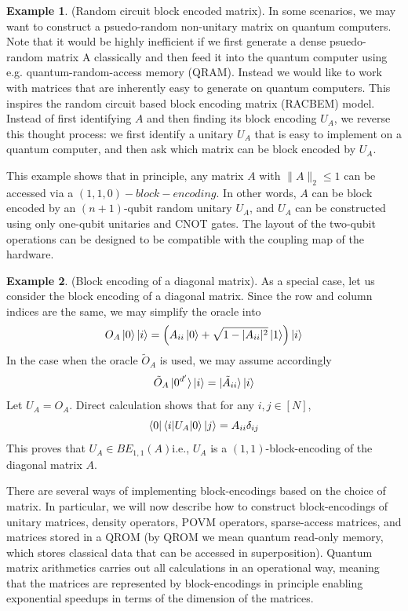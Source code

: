 \documentclass[12pt, oneside]{book}
\theoremstyle{definition}
\theoremstyle{definition}
\newtheorem{example}{Example}[section]
\theoremstyle{remark}
\begin{document}
\begin{example}
    (Random circuit block encoded matrix). In some scenarios, we may want to construct a psuedo-random non-unitary matrix on quantum computers. Note that it would be highly inefficient if we first generate a dense psuedo-random matrix A classically and then feed it into the quantum computer using e.g. quantum-random-access memory (QRAM). Instead we would like to work with matrices that are inherently easy to generate on quantum computers. This inspires the random circuit based block encoding matrix (RACBEM) model. Instead of first identifying $A$ and then finding its block encoding $U_A$, we reverse this thought process: we first identify a unitary $U_A$ that is easy to implement on a quantum computer, and then ask which matrix can be block encoded by $U_A$.
\end{example}
This example shows that in principle, any matrix $A$ with $\|A\|_2\leq 1$ can be accessed via a $(1,1,0)-block-encoding.$ In other words, $A$ can be block encoded by an $(n+1)$-qubit random unitary $U_A$, and $U_A$ can be constructed using only one-qubit unitaries and CNOT gates. The layout of the two-qubit operations can be designed to be compatible with the coupling map of the hardware.

\begin{example}
    (Block encoding of a diagonal matrix). As a special case, let us consider the block encoding of a diagonal matrix. Since the row and column indices are the same, we may simplify the oracle into
    \[
    O_A\ket{0}\ket{i}=\left(A_{ii}\ket{0}+\sqrt{1-|A_{ii}|^2} \ket{1}\right)\ket{i}
    \]
    In the case when the oracle $\tilde{O}_A$ is used, we may assume accordingly
    \[
    \tilde{O}_A\ket{0^{d'}}\ket{i}=\ket{\tilde{A}_{ii}}\ket{i}
    \]
    Let $U_A=O_A$. Direct calculation shows that for any $i,j\in[N]$,
    \[
    \bra{0}\braket{i|U_A|0}\ket{j}=A_{ii}\delta_{ij}
    \]
    This proves that $U_A\in BE_{1,1}(A)$i.e., $U_A$ is a $(1,1)$-block-encoding of the diagonal matrix $A$.
\end{example}
There are several ways of implementing block-encodings based on the choice of matrix. In particular, we will now describe how to construct block-encodings of unitary matrices, density operators, POVM operators, sparse-access matrices, and matrices stored in a QROM (by QROM we mean quantum read-only memory, which stores classical data that can be accessed in superposition). Quantum matrix arithmetics carries out all calculations in an operational way, meaning that the matrices are represented by block-encodings in principle enabling exponential speedups in terms of the dimension of the matrices.
\end{document}
